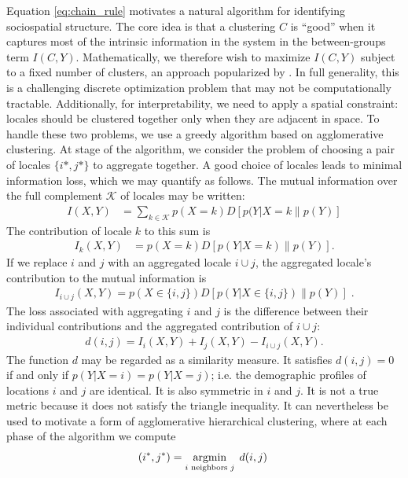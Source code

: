 \documentclass[9pt,twocolumn,twoside]{pnas-new}
\begin{document}
	Equation \eqref{eq:chain_rule} motivates a natural algorithm for identifying sociospatial structure. The core idea is that a clustering $C$ is ``good'' when it captures most of the intrinsic information in the system in the between-groups term $I(C,Y)$. Mathematically, we therefore wish to maximize $I(C,Y)$ subject to a fixed number of clusters, an approach popularized by \cite{Dhillon2003,Banerjee2005}. In full generality, this is a challenging discrete optimization problem that may not be computationally tractable. Additionally, for interpretability, we need to apply a spatial constraint: locales should be clustered together only when they are adjacent in space. To handle these two problems, we use a greedy algorithm based on agglomerative clustering. At stage of the algorithm, we consider the problem of choosing a pair of locales $\{i*, j*\}$ to aggregate together. A good choice of locales leads to minimal information loss, which we may quantify as follows. The mutual information over the full complement $\mathcal{K}$ of locales may be written: 
	\begin{align*}
	 	I(X,Y) &= \sum_{k \in \mathcal{K}} p(X = k) D[p(Y|X = k\|p(Y)] 
	\end{align*} 
	The contribution of locale $k$ to this sum is 
	\begin{align*}
		I_{k}(X,Y) &= p(X = k)D[p(Y|X = k)\|p(Y)]. 
	\end{align*}
	If we replace $i$ and $j$ with an aggregated locale $i\cup j$, the aggregated locale's contribution to the mutual information is 
	\begin{align*}
		I_{i\cup j}(X,Y) = p(X \in \{i,j\}) D[p(Y|X \in \{i,j\}) \| p(Y)]\;.
	\end{align*}
	The loss associated with aggregating $i$ and $j$ is the difference between their individual contributions and the aggregated contribution of $i\cup j$:
	\begin{align*}
		d(i,j) = I_{i}(X,Y) + I_{j}(X,Y) - I_{i \cup j}(X,Y).  
	\end{align*}
	The function $d$ may be regarded as a similarity measure. It satisfies $d(i,j) = 0$ if and only if $p(Y|X = i) = p(Y|X = j)$; i.e. the demographic profiles of locations $i$ and $j$ are identical. It is also symmetric in $i$ and $j$. It is not a true metric because it does not satisfy the triangle inequality. It can nevertheless be used to motivate a form of agglomerative hierarchical clustering, where at each phase of the algorithm we compute 
	\begin{equation}
		(i^*, j^*) = \argmin_{i \text{ neighbors } j} \; d(i,j)\; \label{eq:cluster_opt}
	\end{equation}
\end{document}
